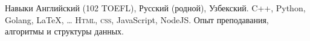 
\begin{rubric}{Навыки}
\entry*[Языки]
	Английский (102 TOEFL), Русский (родной), Узбекский.
\entry*[ЯП\hfill]
	C++, Python, Golang, \LaTeX, \ldots
\entry*[Веб]
	\textsc{Html, css}, JavaScript, NodeJS.
\entry*[Разное]
	Опыт преподавания, алгоритмы и структуры данных.
\end{rubric}

